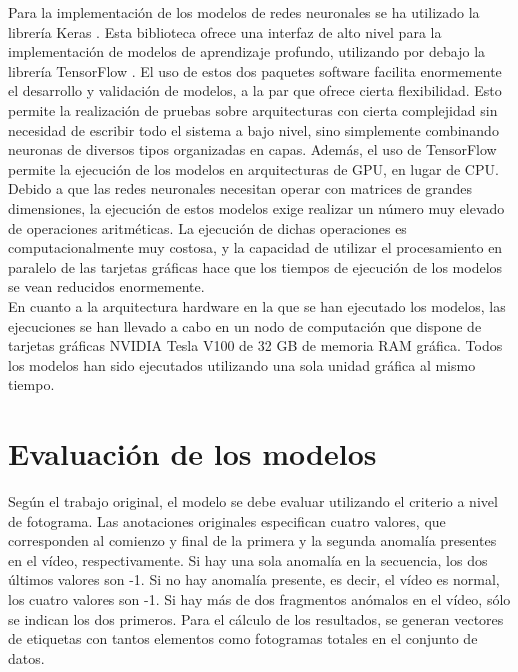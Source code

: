 \documentclass[../main.tex]{memoir}
\begin{document}
Para la implementación de los modelos de redes neuronales se ha
utilizado la librería Keras \cite{chollet2015keras}. Esta biblioteca
ofrece una interfaz de alto nivel para la implementación de modelos de
aprendizaje profundo, utilizando por debajo la librería TensorFlow
\cite{tensorflow2015-whitepaper}. El uso de estos dos paquetes
software facilita enormemente el desarrollo y validación de modelos, a
la par que ofrece cierta flexibilidad. Esto permite la realización de
pruebas sobre arquitecturas con cierta complejidad sin necesidad de
escribir todo el sistema a bajo nivel, sino simplemente combinando
neuronas de diversos tipos organizadas en capas. Además, el uso de
TensorFlow permite la ejecución de los modelos en arquitecturas de
GPU, en lugar de CPU. Debido a que las redes neuronales necesitan
operar con matrices de grandes dimensiones, la ejecución de estos
modelos exige realizar un número muy elevado de operaciones
aritméticas. La ejecución de dichas operaciones es computacionalmente
muy costosa, y la capacidad de utilizar el procesamiento en paralelo
de las tarjetas gráficas hace que los tiempos de ejecución de
los modelos se vean reducidos enormemente.\\

En cuanto a la arquitectura hardware en la que se han ejecutado los
modelos, las ejecuciones se han llevado a cabo en un nodo de computación
que dispone de tarjetas gráficas NVIDIA Tesla V100 de 32 GB de memoria
RAM gráfica. Todos los modelos han sido ejecutados utilizando una sola
unidad gráfica al mismo tiempo.

\section{Evaluación de los modelos}
\label{sec:model-evaluation}

Según el trabajo original, el modelo se debe evaluar utilizando el
criterio a nivel de fotograma. Las anotaciones originales especifican
cuatro valores, que corresponden al comienzo y final de la primera y
la segunda anomalía presentes en el vídeo, respectivamente. Si hay una
sola anomalía en la secuencia, los dos últimos valores son -1. Si no
hay anomalía presente, es decir, el vídeo es normal, los cuatro
valores son -1. Si hay más de dos fragmentos anómalos en el vídeo,
sólo se indican los dos primeros. Para el cálculo de los resultados,
se generan vectores de etiquetas con tantos elementos como fotogramas
totales en el conjunto de datos.\\
\end{document}
